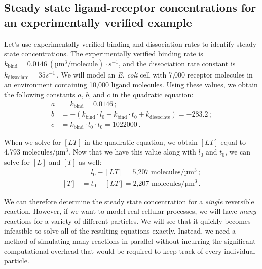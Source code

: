 \fudgespace

\begin{qbox}\end{qbox}

\FloatBarrier
{}
\subsection{Steady state ligand-receptor concentrations for an experimentally verified example}

Let's use experimentally verified binding and dissociation rates to identify steady state concentrations. The experimentally verified binding rate is $k_\text{bind} = 0.0146~(\text{µm}^3/\text{molecule}) \cdot s^{-1}$, and the dissociation rate constant is $k_\text{dissociate} = 35s^{-1}$\,. We will model an \textit{E. coli} cell with 7,000 receptor molecules in an environment containing 10,000 ligand molecules. Using these values, we obtain the following constants $a$, $b$, and $c$ in the quadratic equation:
\begin{align*}
a & = k_\text{bind} = 0.0146\,;\\
b & = - (k_\text{bind} \cdot l_0 + k_\text{bind} \cdot t_0 + k_\text{dissociate}) = -283.2\,;\\
c & = k_\text{bind} \cdot l_0 \cdot t_0 = 1022000\,.
\end{align*}

When we solve for $[LT]$ in the quadratic equation, we obtain $[LT]$ equal to 4,793 $\text{molecules}/\text{µm}^3$. Now that we have this value along with $l_0$ and $t_0$, we can solve for $[L]$ and $[T]$ as well:
\begin{align*}
[L] & = l_0 - [LT] = \text{5,207 molecules}/\text{µm}^3\,;\\
[T] & = t_0 - [LT] = \text{2,207 molecules}/\text{µm}^3\,.
\end{align*}

We can therefore determine the steady state concentration for a \textit{single} reversible reaction. However, if we want to model real cellular processes, we will have \textit{many} reactions for a variety of different particles. We will see that it quickly becomes infeasible to solve all of the resulting equations exactly. Instead, we need a method of simulating many reactions in parallel without incurring the significant computational overhead that would be required to keep track of every individual particle.\\

